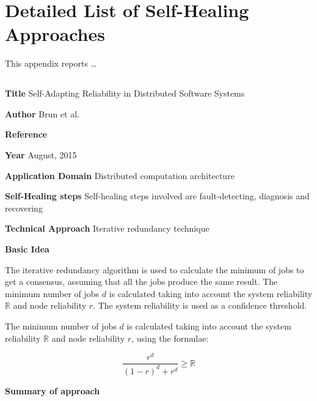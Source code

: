 \appendix
\chapter{Detailed List of Self-Healing Approaches}
\label{ap:approches}

This appendix reports \ldots 

\section{} \label{}
\begin{compactitem}
\item[\textbf{Title}]Self-Adapting Reliability in Distributed Software Systems
\item[\textbf{Author}] 
Brun et al.
\item[\textbf{Reference}] 
\cite{brun_self-adapting_2015}
\item[\textbf{Year}] 
August, 2015
\item[\textbf{Application Domain}] 
Distributed computation architecture
\item[\textbf{Self-Healing steps}] Self-healing steps involved are fault-detecting, diagnosis and recovering
\item[\textbf{Technical Approach}]Iterative redundancy technique
\item[\textbf{Basic Idea}] 

The iterative redundancy algorithm is used to calculate the minimum of jobs to get a consensus, assuming that all the jobs produce the same result. The minimum number of jobs $d$ is calculated taking into account the system reliability $\mathbb{R}$ and node reliability $r$. The system reliability is used as a confidence threshold.

The minimum number of jobs $d$ is calculated taking into account the system reliability $\mathbb{R}$ and node reliability $r$, using the formulae:


 
$$\frac{r^d}{(1-r)^d+r^d}\geq \mathbb{R}$$




\item[\textbf{Summary of approach}]



\end{compactitem}
